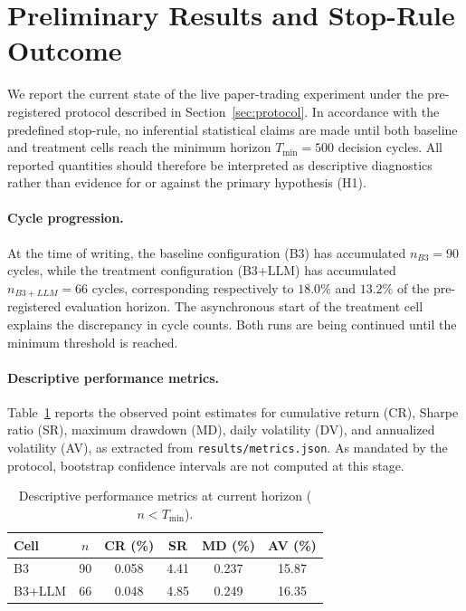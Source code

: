 \documentclass{article}
\begin{document}
\section{Preliminary Results and Stop-Rule Outcome}
\label{sec:results}

We report the current state of the live paper-trading experiment under the pre-registered protocol described in Section~\ref{sec:protocol}. In accordance with the predefined stop-rule, no inferential statistical claims are made until both baseline and treatment cells reach the minimum horizon $T_{\min} = 500$ decision cycles. All reported quantities should therefore be interpreted as descriptive diagnostics rather than evidence for or against the primary hypothesis (H1).

\paragraph{Cycle progression.}
At the time of writing, the baseline configuration (B3) has accumulated $n_{B3} = 90$ cycles, while the treatment configuration (B3+LLM) has accumulated $n_{B3+LLM} = 66$ cycles, corresponding respectively to $18.0\%$ and $13.2\%$ of the pre-registered evaluation horizon. The asynchronous start of the treatment cell explains the discrepancy in cycle counts. Both runs are being continued until the minimum threshold is reached.

\paragraph{Descriptive performance metrics.}
Table~\ref{tab:metrics} reports the observed point estimates for cumulative return (CR), Sharpe ratio (SR), maximum drawdown (MD), daily volatility (DV), and annualized volatility (AV), as extracted from \texttt{results/metrics.json}. As mandated by the protocol, bootstrap confidence intervals are not computed at this stage.

\begin{table}[h]
\centering
\caption{Descriptive performance metrics at current horizon ($n < T_{\min}$).}
\label{tab:metrics}
\begin{tabular}{lccccc}
\toprule
Cell & $n$ & CR (\%) & SR & MD (\%) & AV (\%) \\
\midrule
B3 & 90 & 0.058 & 4.41 & 0.237 & 15.87 \\
B3+LLM & 66 & 0.048 & 4.85 & 0.249 & 16.35 \\
\bottomrule
\end{tabular}
\end{table}
\end{document}
